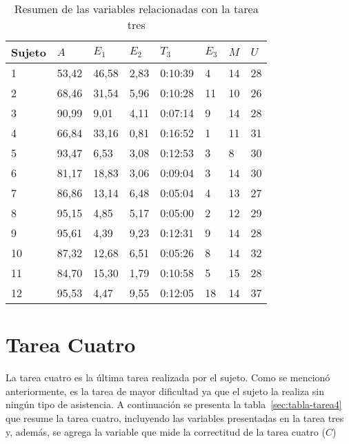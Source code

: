 \begin{table}[H]
\centering
\footnotesize
\begin{tabular}{|p{1.6cm}|p{1.6cm}|p{1.6cm}|p{1.6cm}|p{1.6cm}|p{1.6cm}|p{1.6cm}|p{1.6cm}|}
\hline
    Sujeto &  $A$     & $E_1$    & $E_2$   & $T_3$      & $E_3$ & $M$ & $U$ \\
    \hline 
    1      & 53,42  & 46,58  & 2,83 & 0:10:39 & 4  & 14      &  28 \\
    2      & 68,46  & 31,54  & 5,96 & 0:10:28 & 11 & 10      &  26 \\
    3      & 90,99  & 9,01   & 4,11 & 0:07:14 & 9  & 14      &  28 \\
    4      & 66,84  & 33,16  & 0,81 & 0:16:52 & 1  & 11      &  31 \\
    5      & 93,47  & 6,53   & 3,08 & 0:12:53 & 3  & 8       &  30 \\
    6      & 81,17  & 18,83  & 3,06 & 0:09:04 & 3  & 14      &  30 \\
    7      & 86,86  & 13,14  & 6,48 & 0:05:04 & 4  & 13      &  27 \\
    8      & 95,15  & 4,85   & 5,17 & 0:05:00 & 2  & 12      &  29 \\
    9      & 95,61  & 4,39   & 9,23 & 0:12:31 & 9  & 14      &  28 \\
    10     & 87,32  & 12,68  & 6,51 & 0:05:26 & 8  & 14      &  32 \\
    11     & 84,70  & 15,30  & 1,79 & 0:10:58 & 5  & 15      &  28 \\
    12     & 95,53  & 4,47   & 9,55 & 0:12:05 & 18 & 14      &  37 \\
\hline
\end{tabular}
\caption{Resumen de las variables relacionadas con la tarea tres}
\label{sec:tabla-tarea3}
\end{table}

\section{Tarea Cuatro}

La tarea cuatro es la \'ultima tarea realizada por el sujeto. Como se mencion\'o anteriormente, es la tarea
de mayor dificultad ya que el sujeto la realiza sin ning\'un tipo de asistencia. A continuaci\'on se presenta
la tabla~\ref{sec:tabla-tarea4} que resume la tarea cuatro, incluyendo las variables presentadas en la tarea tres y, adem\'as, se
agrega la variable que mide la correctitud de la tarea cuatro ($C$)

